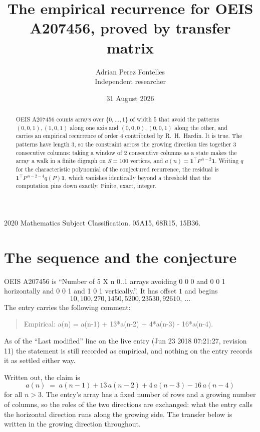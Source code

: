 \documentclass[11pt,a4paper]{article}
\title{The empirical recurrence for OEIS A207456, proved by transfer matrix}
\author{Adrian Perez Fontelles\\ \small Independent researcher}
\date{31 August 2026}
\theoremstyle{plain}
\theoremstyle{definition}
\begin{document}
\maketitle

\begin{abstract}
OEIS A207456 counts arrays over $\{0,\dots,1\}$ of width $5$ that avoid the patterns
$(0,0,1), (1,0,1)$ along one axis and $(0,0,0), (0,0,1)$ along the other, and carries an empirical recurrence of
order $4$ contributed by R.~H.~Hardin. It is true. The patterns have length $3$, so
the constraint across the growing direction ties together $3$ consecutive columns: taking a
window of $2$ consecutive columns as a state makes the array a walk in a finite digraph
on $S=100$ vertices, and $a(n)=\mathbf{1}^{\!\top}P^{\,n-2}\mathbf{1}$. Writing $q$
for the characteristic polynomial of the conjectured recurrence, the residual is
$\mathbf{1}^{\!\top}P^{\,n-2-4}q(P)\mathbf{1}$, which vanishes identically
beyond a threshold that the computation pins down exactly. Finite, exact, integer.
\end{abstract}

\noindent\small 2020 Mathematics Subject Classification. 05A15, 68R15, 15B36.\normalsize

\section{The sequence and the conjecture}

OEIS A207456 is ``Number of 5 X n 0..1 arrays avoiding 0 0 0 and 0 0 1 horizontally and 0 0 1 and 1 0 1 vertically.''. It has offset
$1$ and begins
\[
10, 100, 270, 1450, 5200, 23530, 92610,\ \dots
\]
The entry carries the following comment:
\begin{quote}\small
Empirical: a(n) = a(n-1) + 13*a(n-2) + 4*a(n-3) - 16*a(n-4).
\end{quote}
As of the ``Last modified'' line on the live entry (Jun 23 2018 07:21:27, revision
11) the statement is still recorded as empirical, and nothing on the entry
records it as settled either way.

Written out, the claim is
\begin{equation}\label{eq:conj}
a(n)\;=\;a(n-1) + 13\,a(n-2) + 4\,a(n-3) - 16\,a(n-4)
\end{equation}
for all $n>3$. The entry's array has a fixed number of rows and a growing number of
columns, so the roles of the two directions are exchanged: what the entry calls the
horizontal direction runs along the growing side. The transfer below is written in the
growing direction throughout.
\end{document}

